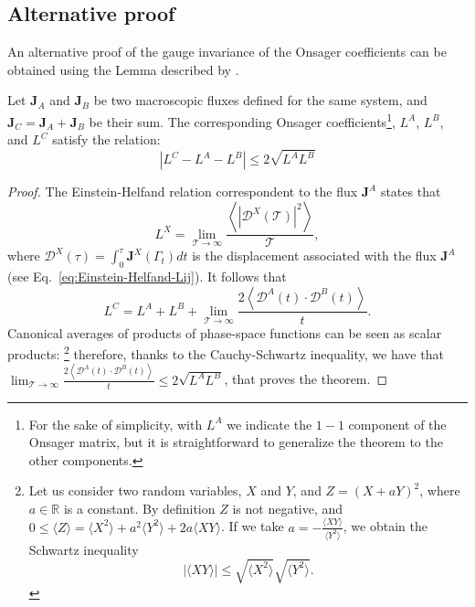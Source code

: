 \subsection{Alternative proof}
\begin{LEtext}
An alternative proof of the gauge invariance of the Onsager coefficients can be obtained using the Lemma described by \citet{Marcolongo2016}.
\begin{theorem} \label{th:aris-theorem}
Let $\mathbf{J}_A$ and $\mathbf{J}_B$ be two macroscopic fluxes defined for the same system, and  $\mathbf{J}_{C} = \mathbf{J}_A + \mathbf{J}_B$ be their sum. The corresponding Onsager coefficients\footnote{For the sake of simplicity, with $L^A$ we indicate the $1-1$ component of the Onsager matrix, but it is straightforward to generalize the theorem to the other components.}, $L^{A}$, $L^{B}$, and $L^{C}$ satisfy the relation:
\begin{equation} \label{eq:aris-theorem}
    \left| L^{C} - L^{A} - L^{B} \right| \leq 2 \sqrt{L^{A} L^{B}}
\end{equation}
\end{theorem}
\begin{proof}
The Einstein-Helfand relation correspondent to the flux $\mathbf{J}^A$ states that 
\begin{equation}
    L^{X} = \lim_{\mathcal{T}\rightarrow\infty} \frac{\left\langle|\mathcal{D}^X(\mathcal{T})|^2\right\rangle} {\mathcal{T}},
\end{equation}
where $\mathcal{D}^X(\tau)=\int_0^\tau \mathbf{J}^X(\Gamma_t) dt$ is the displacement associated with the flux $\mathbf{J}^A$ (see Eq.~\eqref{eq:Einstein-Helfand-Lij}). It follows that 
\begin{equation}
    L^{C} = L^{A} + L^{B} + \lim_{\mathcal{T}\rightarrow\infty} \frac{2\left\langle \mathcal{D}^A(t) \cdot \mathcal{D}^B(t)\right\rangle} {t}.
\end{equation}
Canonical averages of products of phase-space functions can be seen as scalar products:
\footnote{Let us consider two random variables, $X$ and $Y$, and $Z=(X+aY)^2$, where $a\in \mathbb{R}$ is a constant. By definition $Z$ is not negative, and $0\leq \langle Z \rangle = \langle X^2 \rangle + a^2 \langle Y^2 \rangle + 2a \langle XY \rangle$. If we take $a = -\frac{\langle XY \rangle}{\langle Y^2 \rangle}$, we obtain the Schwartz inequality
\begin{equation} \label{eq:schwartz-ineq}
    |\langle XY \rangle| \leq \sqrt{\langle X^2 \rangle} \sqrt{\langle Y^2 \rangle}.
\end{equation}}
therefore, thanks to the Cauchy-Schwartz inequality, we have that $\lim_{\mathcal{T}\rightarrow\infty} \frac{2\left\langle \mathcal{D}^A(t) \cdot \mathcal{D}^B(t)\right\rangle} {t} \leq 2\sqrt{L^{A} L^{B}}$, that proves the theorem. 
\end{proof}


\end{LEtext}
